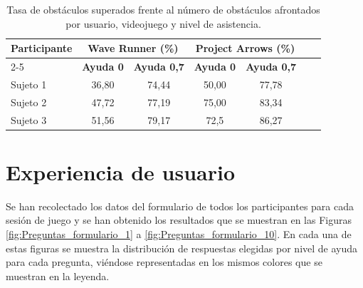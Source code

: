 \begin{table}[h!]
      \centering
      \begin{tabular}{|l|c|c|c|c|c|c|}
            \hline
            \multirow{2}{*}{\textbf{Participante}} & \multicolumn{2}{c|}{\textbf{Wave Runner (\%)}} & \multicolumn{2}{c|}{\textbf{Project Arrows (\%)}}                                         \\ \cline{2-5}
                                                   & \textbf{Ayuda 0}                               & \textbf{Ayuda 0,7}                                & \textbf{Ayuda 0} & \textbf{Ayuda 0,7} \\ \hline
            Sujeto 1                               & 36,80                                          & 74,44                                             & 50,00            & 77,78              \\ \hline
            Sujeto 2                               & 47,72                                          & 77,19                                             & 75,00            & 83,34              \\ \hline
            Sujeto 3                               & 51,56                                          & 79,17                                             & 72,5             & 86,27              \\ \hline
      \end{tabular}
      \caption{Tasa de obstáculos superados frente al número de obstáculos afrontados por usuario, videojuego y nivel de asistencia.}
      \label{tab:tasas_aciertos}
\end{table}

\section{Experiencia de usuario}
\label{sec:rt_res_formulario}
Se han recolectado los datos del formulario de todos los participantes para cada sesión de juego y se han obtenido los resultados que se muestran en las
Figuras \ref{fig:Preguntas_formulario_1} a \ref{fig:Preguntas_formulario_10}.
En cada una de estas figuras se muestra la distribución de respuestas elegidas
por nivel de ayuda para cada pregunta, viéndose representadas en los mismos
colores que se muestran en la leyenda.

